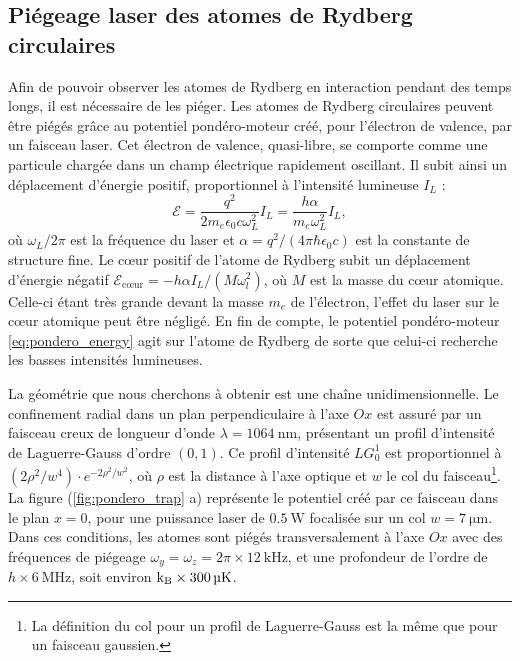 	\subsection{Piégeage laser des atomes de Rydberg circulaires}\label{subsec:circ_laser_trapping}
\noindent Afin de pouvoir observer les atomes de Rydberg en interaction pendant des temps longs, il est nécessaire de les piéger.
Les atomes de Rydberg circulaires peuvent être piégés grâce au potentiel pondéro-moteur créé, pour l'électron de valence, par un faisceau laser.
Cet électron de valence, quasi-libre, se comporte comme une particule chargée dans un champ électrique rapidement oscillant.
Il subit ainsi un déplacement d'énergie positif, proportionnel à l'intensité lumineuse $I_L$ \cite{MX_FABRERYDHF76} :
\begin{equation}
\label{eq:pondero_energy}
\mathcal{E} = \frac{q^2}{2m_e \epsilon_0 c \omega_L^2} I_L
= \frac{h\alpha}{m_e\omega_L^2}I_L,
\end{equation}
où $\omega_L/2\pi$ est la fréquence du laser et $\alpha = q^2/(4\pi\hbar\epsilon_0 c)$ est la constante de structure fine.
Le c\oe ur positif de l'atome de Rydberg subit un déplacement d'énergie négatif $\mathcal{E}_{\text{c\oe ur}} = - h\alpha I_L/(M\omega_l^2)$, où $M$ est la masse du c\oe ur atomique.
Celle-ci étant très grande devant la masse $m_e$ de l'électron, l'effet du laser sur le c\oe ur atomique peut être négligé.
En fin de compte, le potentiel pondéro-moteur \eqref{eq:pondero_energy} agit sur l'atome de Rydberg de sorte que celui-ci recherche les basses intensités lumineuses.

La géométrie que nous cherchons à obtenir est une chaîne unidimensionnelle.
Le confinement radial dans un plan perpendiculaire à l'axe $Ox$ est assuré par un faisceau \og creux \fg{} de longueur d'onde $\lambda=\SI{1064}{\nano\meter}$, présentant un profil d'intensité de Laguerre-Gauss d'ordre $(0,1)$.
Ce profil d'intensité $LG_0^1$ est proportionnel à $(2\rho^2/w^4)\cdot e^{-2\rho^2/w^2}$, où $\rho$ est la distance à l'axe optique et $w$ le col du faisceau\footnote{
La définition du col pour un profil de Laguerre-Gauss 
est la même que pour un faisceau gaussien.
}.
La figure (\ref{fig:pondero_trap} a) représente le potentiel créé par ce faisceau dans le plan $x=0$, pour une puissance laser de $\SI{0.5}{\watt}$ focalisée sur un col $w=\SI{7}{\um}$.
Dans ces conditions, les atomes sont piégés transversalement à l'axe $Ox$ avec des fréquences de piégeage $\omega_y=\omega_z= 2\pi\times \SI{12}{\kHz}$, et une profondeur de l'ordre de $h\times \SI{6}{\MHz}$, soit environ $\mathrm{k_B}\times\SI{300}{\si{\micro\kelvin}}$.

